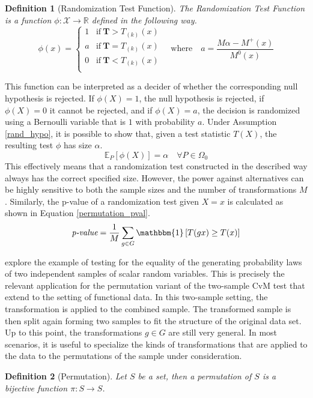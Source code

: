 \documentclass[12pt, a4paper]{article}
\theoremstyle{MAstyle} \newtheorem{assumption}{Assumption}[section]
\theoremstyle{MAstyle} \newtheorem{definition}{Definition}[section]
\theoremstyle{MAstyle} \newtheorem{theorem}{Theorem}[section]
\begin{document}
			\newpage
			\begin{definition}[Randomization Test Function]\label{RandTestFunc}
				The Randomization Test Function is a function $\phi: \mathcal{X} \rightarrow \mathbb{R}$ defined in the following way.
					\begin{equation*}
						\phi(x) = \begin{cases}
							1 &\text{if} \ \textbf{T} > T_{(k)}(x) \\
							a &\text{if} \ \textbf{T} = T_{(k)}(x) \\
							0 &\text{if} \ \textbf{T} < T_{(k)}(x) \\
						\end{cases} \quad \text{where} \quad
						a = \frac{M\alpha - M^{+}(x)}{M^{0}(x)}
					\end{equation*}
				
			\end{definition}
			This function can be interpreted as a decider of whether the corresponding null hypothesis is rejected. If $\phi(X) = 1$, the null hypothesis is rejected, if $\phi(X) = 0$ it cannot be rejected, and if $\phi(X) = a$, the decision is randomized using a Bernoulli variable that is $1$ with probability $a$. 
			Under Assumption \ref{rand_hypo}, it is possible to show that, given a test statistic $T(X)$, the resulting test $\phi$ has size $\alpha$.
			\begin{equation}
				\mathbb{E}_{P}\left[\phi(X)\right] = \alpha \quad \forall P \in \Omega_0
			\end{equation}
			This effectively means that a randomization test constructed in the described way always has the correct specified size. However, the power against alternatives can be highly sensitive to both the sample sizes and the number of transformations $M$.	
			Similarly, the p-value of a randomization test given $X = x$ is calculated as shown in Equation \ref{permutation_pval}.
			\begin{equation}\label{permutation_pval}
				\textit{p-value} = \frac{1}{M} \sum_{g \in G} \mathbbm{1}\left[T(gx) \geq T(x)\right]
			\end{equation}
					
			\cite{lehmann_testing_2005} explore the example of testing for the equality of the generating probability laws of two independent samples of scalar random variables. This is precisely the relevant application for the permutation variant of the two-sample CvM test that \cite{bugni_permutation_2021} extend to the setting of functional data. In this two-sample setting, the transformation is applied to the combined sample. The transformed sample is then split again forming two samples to fit the structure of the original data set.
			Up to this point, the transformations $g \in G$ are still very general. In most scenarios, it is useful to specialize the kinds of transformations that are applied to the data to the permutations of the sample under consideration.
			\begin{definition}[Permutation]\label{permutation}
				Let $S$ be a set, then a permutation of $S$ is a bijective function $\pi: S \rightarrow S$.
			\end{definition}
		
\end{document}
